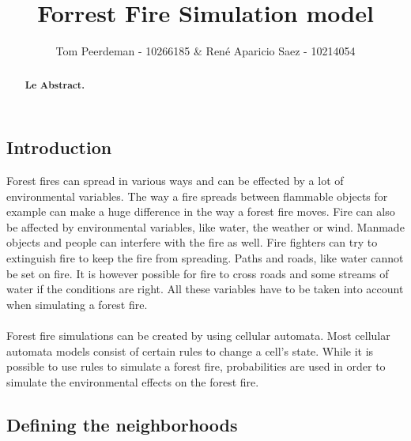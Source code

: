 \documentclass{article}
\title{Forrest Fire Simulation model}
\author{Tom Peerdeman - 10266185 \& Ren\'e Aparicio Saez - 10214054}
\begin{document}
\maketitle

\begin{abstract}
\textbf{Le Abstract.}
\end{abstract}

\begin{multicols}{2}

\subsection*{Introduction}
Forest fires can spread in various ways and can be effected by a lot of environmental variables. The way a fire spreads between flammable objects for example can make a huge difference in the way a forest fire moves. Fire can also be affected by environmental variables, like water, the weather or wind. Manmade objects and people can interfere with the fire as well. Fire fighters can try to extinguish fire to keep the fire from spreading. Paths and roads, like water cannot be set on fire. It is however possible for fire to cross roads and some streams of water if the conditions are right. All these variables have to be taken into account when simulating a forest fire.\\\\
Forest fire simulations can be created by using cellular automata. Most cellular automata models consist of certain rules to change a cell’s state. While it is possible to use rules to simulate a forest fire, probabilities are used in order to simulate the environmental effects on the forest fire.

\subsection*{Defining the neighborhoods}

\end{multicols}
\end{document}
